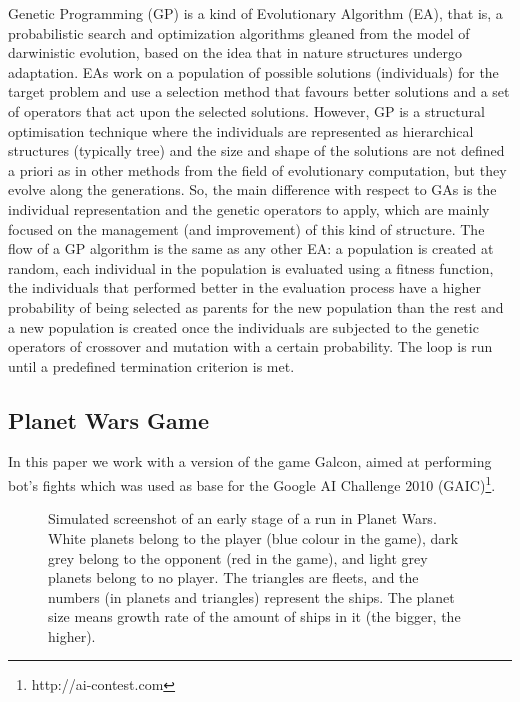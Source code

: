\documentclass[preprint]{elsarticle}
\begin{document}
Genetic Programming (GP) \cite{GP_Koza92} is a kind of Evolutionary Algorithm (EA), that is, a probabilistic search and optimization algorithms gleaned from the model of darwinistic evolution, based on the idea that in nature structures undergo adaptation. EAs work on a population of possible solutions (individuals) for the target problem and use a selection method that favours better solutions and a set of operators that act upon the selected solutions. %
However, GP is a structural optimisation technique where the individuals are represented as hierarchical structures (typically tree) and the size and shape of the solutions are not defined a priori as in other methods from the field of evolutionary computation, but they evolve along the generations. So, the main difference with respect to GAs is the individual representation and the genetic operators to apply, which are mainly focused on the management (and improvement) of this kind of structure.
The flow of a GP algorithm is the same as any other EA: a population is created at random, each individual in the population is evaluated using a fitness function, the individuals that performed better in the evaluation process have a higher probability of being selected as parents for the new population than the rest and a new population is created once the individuals are subjected to the genetic operators of crossover and mutation with a certain probability. The loop is run until a predefined termination criterion is met.


\subsection{Planet Wars Game}
In this paper we work with a %
version of the game Galcon, aimed at performing bot's fights which was used as base for the Google AI Challenge 2010 (GAIC)\footnote{http://ai-contest.com}.

 \begin{figure}[ht]
 \begin{center}
 \end{center}
 \caption{Simulated screenshot of an early stage of a run in Planet Wars. White planets belong to the player (blue colour in the game), dark grey belong to the opponent (red in the game), and light grey planets belong to no player. The triangles are fleets, and the numbers (in planets and triangles) represent the ships. The planet size means growth rate of the amount of ships in it (the bigger, the higher).}
 \label{figura:PlanetWars1}
 \end{figure}
\end{document}
